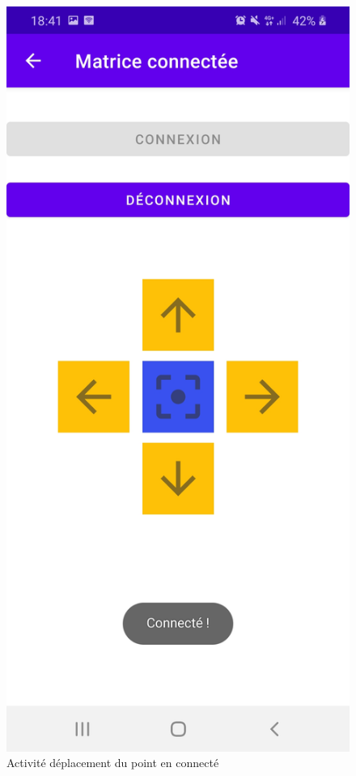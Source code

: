 \documentclass[a4paper,12pt]{report}
\begin{document}
		\begin{figure}[H]
			\centering
				\includegraphics[scale=0.2]{images/depco.jpg}
				\caption{Activité déplacement du point en connecté}
		\end{figure}
		
\end{document}
